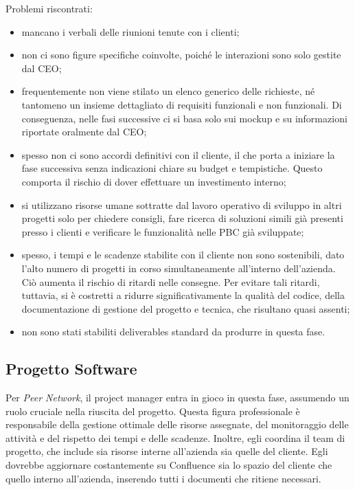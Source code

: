     Problemi riscontrati:
    \begin{itemize}
        \item mancano i verbali delle riunioni tenute con i clienti;
        \item non ci sono figure specifiche coinvolte, poiché le interazioni sono solo gestite dal CEO;
        \item frequentemente non viene stilato un elenco generico delle richieste, né tantomeno un insieme dettagliato
        di requisiti funzionali e non funzionali. Di conseguenza, nelle fasi successive ci si basa solo sui mockup e
        su informazioni riportate oralmente dal CEO;
        \item spesso non ci sono accordi definitivi con il cliente, il che porta a iniziare la fase successiva senza indicazioni
        chiare su budget e tempistiche. Questo comporta il rischio di dover effettuare un investimento interno;
        \item si utilizzano risorse umane sottratte dal lavoro operativo di sviluppo in altri progetti solo per chiedere consigli,
        fare ricerca di soluzioni simili già presenti presso i clienti e verificare le funzionalità nelle \ac{PBC} già sviluppate;
        \item spesso, i tempi e le scadenze stabilite con il cliente non sono sostenibili, dato l'alto numero di progetti in
        corso simultaneamente all'interno dell'azienda. Ciò aumenta il rischio di ritardi nelle consegne. Per evitare tali ritardi,
        tuttavia, si è costretti a ridurre significativamente la qualità del codice, della documentazione di gestione del progetto e tecnica,
        che risultano quasi assenti;
        \item non sono stati stabiliti deliverables standard da produrre in questa fase.
    \end{itemize}

    \subsection{Progetto Software}
    Per \textit{Peer Network}, il project manager entra in gioco in questa fase, assumendo un ruolo cruciale nella riuscita del progetto.
    Questa figura professionale è responsabile della gestione ottimale delle risorse assegnate, del monitoraggio delle attività
    e del rispetto dei tempi e delle scadenze. Inoltre, egli coordina il team di progetto, che include sia risorse interne all'azienda
    sia quelle del cliente. Egli dovrebbe aggiornare costantemente su Confluence sia lo spazio del cliente che quello interno all'azienda,
    inserendo tutti i documenti che ritiene necessari.

